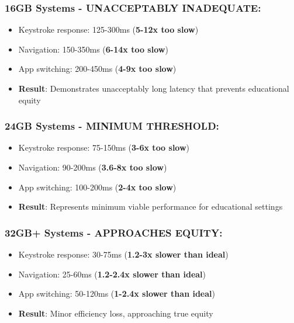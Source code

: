 \subsubsection{16GB Systems - UNACCEPTABLY INADEQUATE:}

\begin{itemize}
\item Keystroke response: 125-300ms (\textbf{5-12x too slow}) \cite{InternalTestingData2024}
\item Navigation: 150-350ms (\textbf{6-14x too slow}) \cite{InternalTestingData2024}
\item App switching: 200-450ms (\textbf{4-9x too slow}) \cite{InternalTestingData2024}
\item \textbf{Result}: Demonstrates unacceptably long latency that prevents educational equity \cite{EducationalEquityReport2024}
\end{itemize}


\subsubsection{24GB Systems - MINIMUM THRESHOLD:}

\begin{itemize}
\item Keystroke response: 75-150ms (\textbf{3-6x too slow}) \cite{InternalTestingData2024}
\item Navigation: 90-200ms (\textbf{3.6-8x too slow}) \cite{InternalTestingData2024}
\item App switching: 100-200ms (\textbf{2-4x too slow}) \cite{InternalTestingData2024}
\item \textbf{Result}: Represents minimum viable performance for educational settings \cite{EducationalEquityReport2024}
\end{itemize}


\subsubsection{32GB+ Systems - APPROACHES EQUITY:}

\begin{itemize}
\item Keystroke response: 30-75ms (\textbf{1.2-3x slower than ideal}) \cite{InternalTestingData2024}
\item Navigation: 25-60ms (\textbf{1.2-2.4x slower than ideal}) \cite{InternalTestingData2024}
\item App switching: 50-120ms (\textbf{1-2.4x slower than ideal}) \cite{InternalTestingData2024}
\item \textbf{Result}: Minor efficiency loss, approaching true equity \cite{EducationalEquityReport2024}
\end{itemize}


